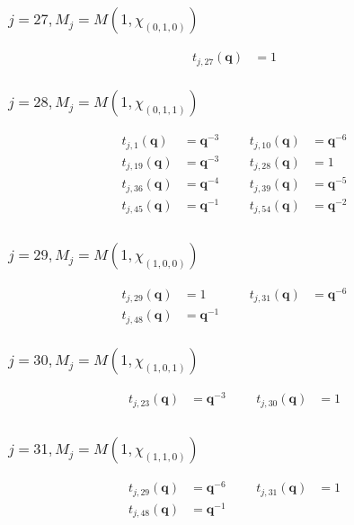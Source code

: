 \subsubsection{$j=27, M_{j}=M(1,\chi_{(0,1,0)})$}
\begin{align*}
t_{j,27}(\boldsymbol{q})&=1
\end{align*}

\subsubsection{$j=28, M_{j}=M(1,\chi_{(0,1,1)})$}
\begin{align*}
t_{j,1}(\boldsymbol{q})&=\boldsymbol{q}^{-3} &&& t_{j,10}(\boldsymbol{q})&=\boldsymbol{q}^{-6} \\
t_{j,19}(\boldsymbol{q})&=\boldsymbol{q}^{-3} &&& t_{j,28}(\boldsymbol{q})&=1 \\
t_{j,36}(\boldsymbol{q})&=\boldsymbol{q}^{-4} &&& t_{j,39}(\boldsymbol{q})&=\boldsymbol{q}^{-5} \\
t_{j,45}(\boldsymbol{q})&=\boldsymbol{q}^{-1} &&& t_{j,54}(\boldsymbol{q})&=\boldsymbol{q}^{-2} \\
\end{align*}

\subsubsection{$j=29, M_{j}=M(1,\chi_{(1,0,0)})$}
\begin{align*}
t_{j,29}(\boldsymbol{q})&=1 &&& t_{j,31}(\boldsymbol{q})&=\boldsymbol{q}^{-6} \\
t_{j,48}(\boldsymbol{q})&=\boldsymbol{q}^{-1}
\end{align*}

\subsubsection{$j=30, M_{j}=M(1,\chi_{(1,0,1)})$}
\begin{align*}
t_{j,23}(\boldsymbol{q})&=\boldsymbol{q}^{-3} &&& t_{j,30}(\boldsymbol{q})&=1 \\
\end{align*}

\subsubsection{$j=31, M_{j}=M(1,\chi_{(1,1,0)})$}
\begin{align*}
t_{j,29}(\boldsymbol{q})&=\boldsymbol{q}^{-6} &&& t_{j,31}(\boldsymbol{q})&=1 \\
t_{j,48}(\boldsymbol{q})&=\boldsymbol{q}^{-1}
\end{align*}

